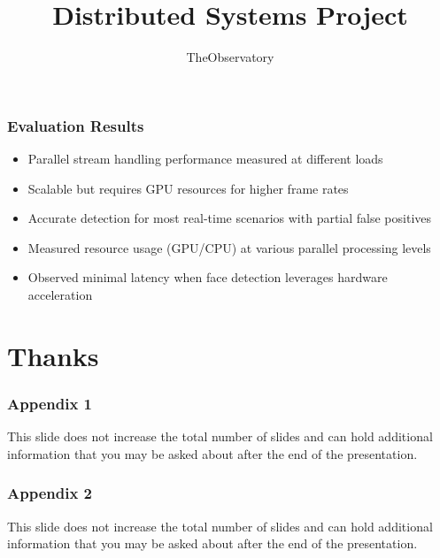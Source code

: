 \documentclass[11pt,t,usepdftitle=false,aspectratio=169]{beamer}
\begin{document}
\begin{frame}
	\frametitle{Evaluation Results}
	\begin{itemize}
		\item Parallel stream handling performance measured at different loads
		\item Scalable but requires GPU resources for higher frame rates
		\item Accurate detection for most real-time scenarios with partial false positives
		\item Measured resource usage (GPU/CPU) at various parallel processing levels
		\item Observed minimal latency when face detection leverages hardware acceleration
	\end{itemize}
\end{frame}


\title[TheObservatory]{Distributed Systems Project}
\subtitle{TheObservatory}
\section{Thanks}


\appendix

\begin{frame} %
	\frametitle{Appendix 1}
	This slide does not increase the total number of slides and can hold additional information
	that you may be asked about after the end of the presentation.
\end{frame}

\begin{frame}
	\frametitle{Appendix 2}
	This slide does not increase the total number of slides and can hold additional information
	that you may be asked about after the end of the presentation.
\end{frame}
\end{document}
